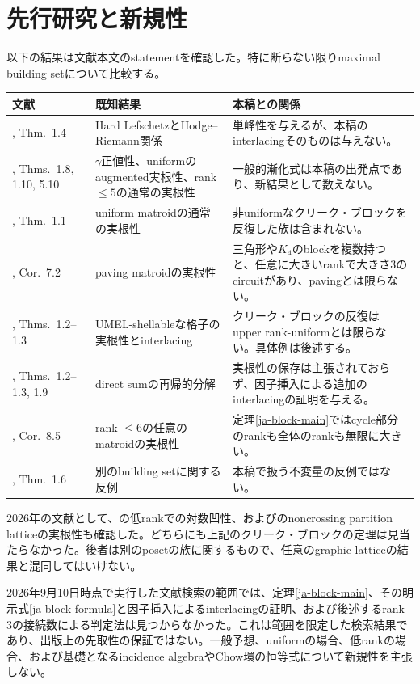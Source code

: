 \documentclass[12pt]{amsart}
\theoremstyle{definition}
\theoremstyle{remark}
\numberwithin{equation}{section}
\begin{document}
\section{先行研究と新規性}
以下の結果は文献本文のstatementを確認した。特に断らない限りmaximal building setについて比較する。
\begin{center}\small
\begin{tabular}{p{2.6cm}p{5.1cm}p{5.4cm}}
\toprule
文献 & 既知結果 & 本稿との関係\\\midrule
\cite{AHK18}, Thm.~1.4 & Hard LefschetzとHodge--Riemann関係 & 単峰性を与えるが、本稿のinterlacingそのものは与えない。\\
\cite{FMSV24}, Thms.~1.8, 1.10, 5.10 & $\gamma$正値性、uniformのaugmented実根性、rank $\leq5$の通常の実根性 & 一般的漸化式は本稿の出発点であり、新結果として数えない。\\
\cite{BV26}, Thm.~1.1 & uniform matroidの通常の実根性 & 非uniformなクリーク・ブロックを反復した族は含まれない。\\
\cite{BVTN25}, Cor.~7.2 & paving matroidの実根性 & 三角形や$K_4$のblockを複数持つと、任意に大きいrankで大きさ3のcircuitがあり、pavingとは限らない。\\
\cite{CFL25}, Thms.~1.2--1.3 & UMEL-shellableな格子の実根性とinterlacing & クリーク・ブロックの反復はupper rank-uniformとは限らない。具体例は後述する。\\
\cite{Pie25}, Thms.~1.2--1.3, 1.9 & direct sumの再帰的分解 & 実根性の保存は主張されておらず、因子挿入による追加のinterlacingの証明を与える。\\
\cite{CFL26}, Cor.~8.5 & rank $\leq6$の任意のmatroidの実根性 & 定理\ref{ja-block-main}ではcycle部分のrankも全体のrankも無限に大きい。\\
\cite{EFMPV26}, Thm.~1.6 & 別のbuilding setに関する反例 & 本稿で扱う不変量の反例ではない。\\\bottomrule
\end{tabular}
\end{center}
2026年の文献として、\cite{SV26}の低rankでの対数凹性、および\cite{Alex26}のnoncrossing partition latticeの実根性も確認した。どちらにも上記のクリーク・ブロックの定理は見当たらなかった。後者は別のposetの族に関するもので、任意のgraphic latticeの結果と混同してはいけない。

2026年9月10日時点で実行した文献検索の範囲では、定理\ref{ja-block-main}、その明示式\eqref{ja-block-formula}と因子挿入によるinterlacingの証明、および後述するrank 3の接続数による判定法は見つからなかった。これは範囲を限定した検索結果であり、出版上の先取性の保証ではない。一般予想、uniformの場合、低rankの場合、および基礎となるincidence algebraやChow環の恒等式について新規性を主張しない。
\end{document}
